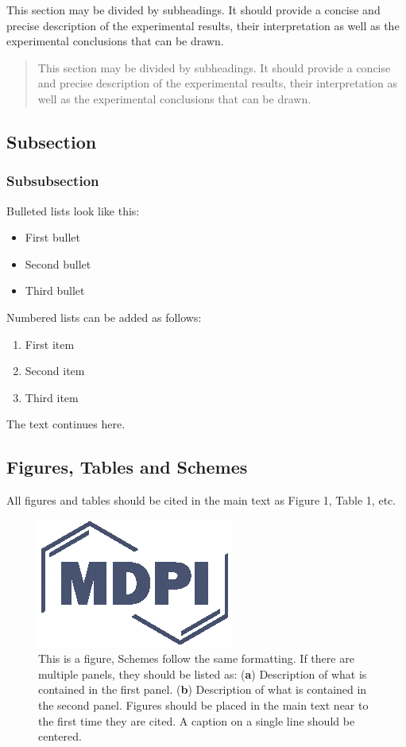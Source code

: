 \documentclass[entropy,article,submit,moreauthors,pdftex,10pt,a4paper]{Definitions/mdpi}
\begin{document}
This section may be divided by subheadings. It should provide a concise and precise description of the experimental results, their interpretation as well as the experimental conclusions that can be drawn.
\begin{quote}
This section may be divided by subheadings. It should provide a concise and precise description of the experimental results, their interpretation as well as the experimental conclusions that can be drawn.
\end{quote}

\subsection{Subsection}

\subsubsection{Subsubsection}

Bulleted lists look like this:
\begin{itemize}[leftmargin=*,labelsep=5.8mm]
\item	First bullet
\item	Second bullet
\item	Third bullet
\end{itemize}

Numbered lists can be added as follows:
\begin{enumerate}[leftmargin=*,labelsep=4.9mm]
\item	First item 
\item	Second item
\item	Third item
\end{enumerate}

The text continues here.

\subsection{Figures, Tables and Schemes}

All figures and tables should be cited in the main text as Figure 1, Table 1, etc.

\begin{figure}[H]
\centering
\includegraphics[width=2 cm]{Definitions/logo-mdpi}
\caption{This is a figure, Schemes follow the same formatting. If there are multiple panels, they should be listed as: (\textbf{a}) Description of what is contained in the first panel. (\textbf{b}) Description of what is contained in the second panel. Figures should be placed in the main text near to the first time they are cited. A caption on a single line should be centered.}
\end{figure}   
\end{document}
